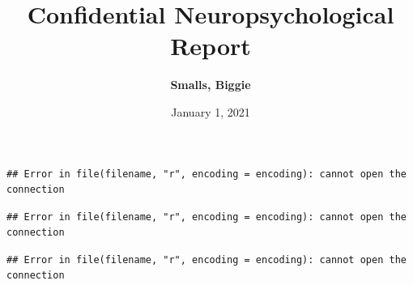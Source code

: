\documentclass[%
numbers=noendperiod,
parskip=half,
bibliography=totoc,
DIV=calc,headsepline=true,
]{scrartcl}
\title{Confidential Neuropsychological Report}
\author[]{\textbf{Smalls, Biggie}}
\date{January 1, 2021}
\begin{document}
\maketitle






\begin{verbatim}
## Error in file(filename, "r", encoding = encoding): cannot open the connection
\end{verbatim}

\begin{verbatim}
## Error in file(filename, "r", encoding = encoding): cannot open the connection
\end{verbatim}

\begin{verbatim}
## Error in file(filename, "r", encoding = encoding): cannot open the connection
\end{verbatim}
\end{document}
